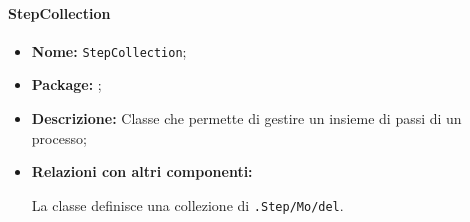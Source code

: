 \paragraph{StepCollection}
\begin{flushleft}
\begin{itemize}
\item \textbf{Nome:} \texttt{StepCollection};
\item \textbf{Package:} \texttt{\collection{}};
\item \textbf{Descrizione:} Classe che permette di gestire un insieme di passi di un processo;
\item \textbf{Relazioni con altri componenti:}
\begin{sloppypar}
La classe definisce una collezione di \texttt{\collection{}.Step\fshyp{}Mo\fshyp{}del}.
\end{sloppypar}
\end{itemize}
\end{flushleft}
